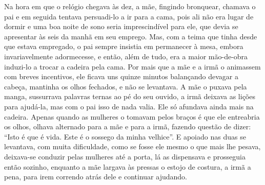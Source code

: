 Na hora em que o relógio chegava às dez, a mãe, fingindo bronquear,
chamava o pai e em seguida tentava persuadi-lo a ir para a cama, pois ali não
era lugar de dormir e uma boa noite de sono seria imprescindível para ele,
que devia se apresentar às seis da manhã em seu emprego. Mas, com a teima
que tinha desde que estava empregado, o pai sempre insistia em permanecer
à mesa, embora invariavelmente adormecesse, e então, além de tudo, era a
maior mão-de-obra induzi-lo a trocar a cadeira pela cama. Por mais que a
mãe e a irmã o animassem com breves incentivos, ele ficava uns quinze
minutos balançando devagar a cabeça, mantinha os olhos fechados, e não se
levantava. A mãe o puxava pela manga, sussurrava palavras ternas ao pé do
seu ouvido, a irmã deixava as lições para ajudá-la, mas com o pai isso de
nada valia. Ele só afundava ainda mais na cadeira. Apenas quando as
mulheres o tomavam pelos braços é que ele entreabria os olhos, olhava
alternado para a mãe e para a irmã, fazendo questão de dizer: “Isto é que
é vida. Este é o sossego da minha velhice”. E apoiado nas duas se
levantava, com muita dificuldade, como se fosse ele mesmo o que mais lhe
pesava, deixava-se conduzir pelas mulheres até a porta, lá as dispensava e
prosseguia então sozinho, enquanto a mãe largava às pressas o estojo de
costura, a irmã a pena, para irem correndo atrás dele e continuar ajudando.

